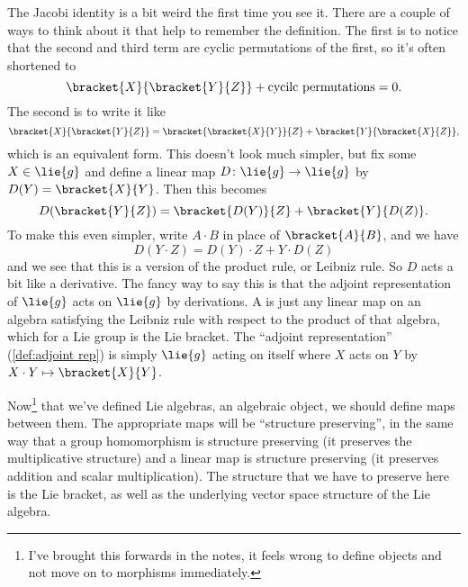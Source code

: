 \documentclass[fleqn]{NotesClass}
\begin{document}
    The Jacobi identity is a bit weird the first time you see it.
    There are a couple of ways to think about it that help to remember the definition.
    The first is to notice that the second and third term are cyclic permutations of the first, so it's often shortened to
    \begin{equation}
        \bracket{X}{\bracket{Y}{Z}} + \text{cycilc permutations} = 0.
    \end{equation}
    The second is to write it like
    \begin{equation}
        \bracket{X}{\bracket{Y}{Z}} = \bracket{\bracket{X}{Y}}{Z} + \bracket{Y}{\bracket{X}{Z}},
    \end{equation}
    which is an equivalent form.
    This doesn't look much simpler, but fix some \(X \in \lie{g}\) and define a linear map \(D \colon \lie{g} \to \lie{g}\) by \(D(Y) = \bracket{X}{Y}\).
    Then this becomes
    \begin{equation}
        D(\bracket{Y}{Z}) = \bracket{D(Y)}{Z} + \bracket{Y}{D(Z)}.
    \end{equation}
    To make this even simpler, write \(A \cdot B\) in place of \(\bracket{A}{B}\), and we have
    \begin{equation}
        D(Y \cdot Z) = D(Y) \cdot Z + Y \cdot D(Z)
    \end{equation}
    and we see that this is a version of the product rule, or Leibniz rule.
    So \(D\) acts a bit like a derivative.
    The fancy way to say this is that the adjoint representation of \(\lie{g}\) acts on \(\lie{g}\) by derivations.
    A  is just any linear map on an algebra satisfying the Leibniz rule with respect to the product of that algebra, which for a Lie group is the Lie bracket.
    The \enquote{adjoint representation} (\cref{def:adjoint rep}) is simply \(\lie{g}\) acting on itself where \(X\) acts on \(Y\) by \(X \cdot Y \mapsto \bracket{X}{Y}\).
    
    Now\footnote{I've brought this forwards in the notes, it feels wrong to define objects and not move on to morphisms immediately.} that we've defined Lie algebras, an algebraic object, we should define maps between them.
    The appropriate maps will be \enquote{structure preserving}, in the same way that a group homomorphism is structure preserving (it preserves the multiplicative structure) and a linear map is structure preserving (it preserves addition and scalar multiplication).
    The structure that we have to preserve here is the Lie bracket, as well as the underlying vector space structure of the Lie algebra.
    
\end{document}
